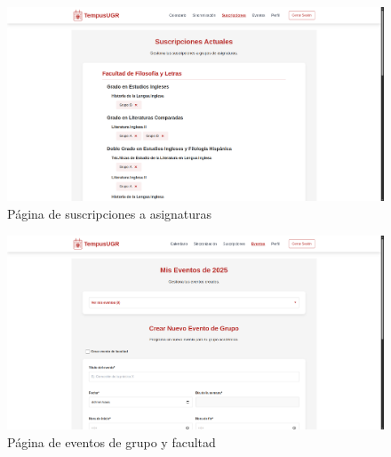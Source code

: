 \begin{figure}[H]
    \centering
    \includegraphics[width=1\textwidth]{figures/07_suscripciones.png}
    \caption{Página de suscripciones a asignaturas}
    \label{suscripciones}
\end{figure}
\begin{figure}[H]
    \centering
    \includegraphics[width=1\textwidth]{figures/07_eventos.png}
    \caption{Página de eventos de grupo y facultad}
    \label{eventos}
\end{figure}

